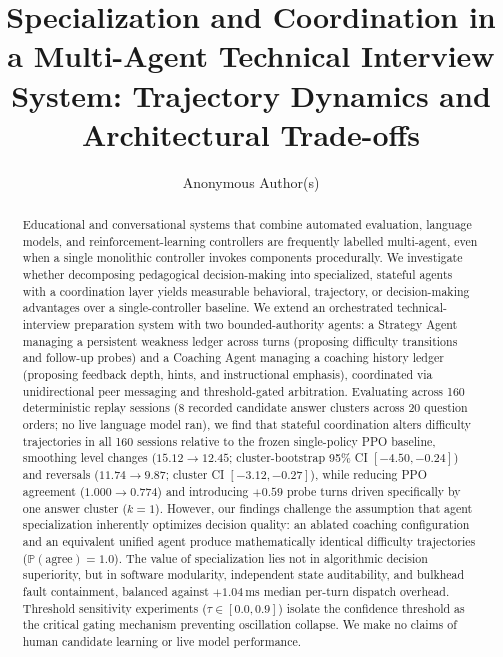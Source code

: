 \documentclass[runningheads]{llncs}
\begin{document}
\title{Specialization and Coordination in a Multi-Agent Technical Interview System: Trajectory Dynamics and Architectural Trade-offs}
\author{Anonymous Author(s)}
\maketitle

\begin{abstract}
Educational and conversational systems that combine automated evaluation, language models, and reinforcement-learning controllers are frequently labelled multi-agent, even when a single monolithic controller invokes components procedurally. We investigate whether decomposing pedagogical decision-making into specialized, stateful agents with a coordination layer yields measurable behavioral, trajectory, or decision-making advantages over a single-controller baseline. We extend an orchestrated technical-interview preparation system with two bounded-authority agents: a Strategy Agent managing a persistent weakness ledger across turns (proposing difficulty transitions and follow-up probes) and a Coaching Agent managing a coaching history ledger (proposing feedback depth, hints, and instructional emphasis), coordinated via unidirectional peer messaging and threshold-gated arbitration. Evaluating across 160 deterministic replay sessions (8 recorded candidate answer clusters across 20 question orders; no live language model ran), we find that stateful coordination alters difficulty trajectories in all 160 sessions relative to the frozen single-policy PPO baseline, smoothing level changes ($15.12 \to 12.45$; cluster-bootstrap 95\% CI $[-4.50, -0.24]$) and reversals ($11.74 \to 9.87$; cluster CI $[-3.12, -0.27]$), while reducing PPO agreement ($1.000 \to 0.774$) and introducing $+0.59$ probe turns driven specifically by one answer cluster ($k=1$). However, our findings challenge the assumption that agent specialization inherently optimizes decision quality: an ablated coaching configuration and an equivalent unified agent produce mathematically identical difficulty trajectories ($\mathbb{P}(\text{agree}) = 1.0$). The value of specialization lies not in algorithmic decision superiority, but in software modularity, independent state auditability, and bulkhead fault containment, balanced against $+1.04$\,ms median per-turn dispatch overhead. Threshold sensitivity experiments ($\tau \in [0.0, 0.9]$) isolate the confidence threshold as the critical gating mechanism preventing oscillation collapse. We make no claims of human candidate learning or live model performance.
\end{abstract}












\end{document}
